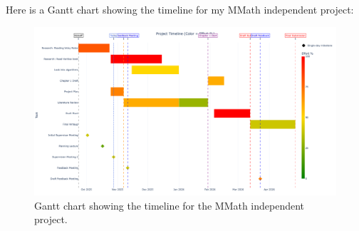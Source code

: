 Here is a Gantt chart showing the timeline for my MMath independent project:


\begin{figure}[h] %
    \centering
    \includegraphics[width=1.2\textwidth]{newplot(3)} %
    \caption{Gantt chart showing the timeline for the MMath independent project.}
    \label{fig:gantt_chart}
\end{figure}


